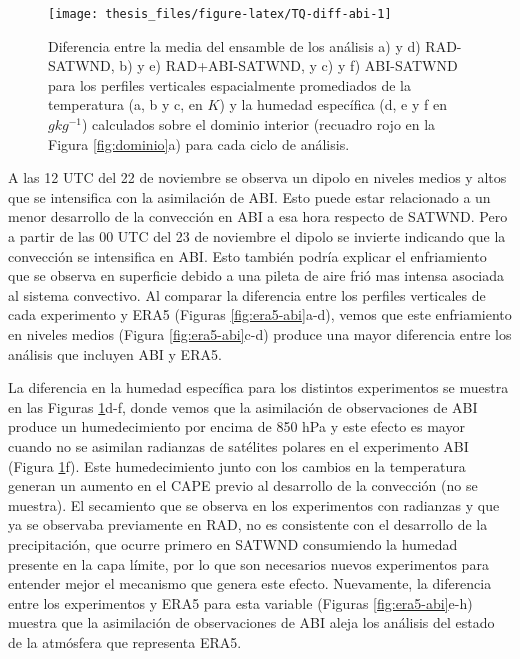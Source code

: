\documentclass[12pt,oneside,a4paper]{reedthesis}
\begin{document}
\begin{figure}

\texttt{[image: thesis\_files/figure-latex/TQ-diff-abi-1]} \hfill{}

\caption{Diferencia entre la media del ensamble de los análisis a) y d) RAD-SATWND, b) y e) RAD+ABI-SATWND, y c) y f) ABI-SATWND para los perfiles verticales espacialmente promediados de la temperatura (a, b y c, en \(K\)) y la humedad específica (d, e y f en \(gkg^{-1}\)) calculados sobre el dominio interior (recuadro rojo en la Figura \ref{fig:dominio}a) para cada ciclo de análisis.}\label{fig:TQ-diff-abi}
\end{figure}
A las 12 UTC del 22 de noviembre se observa un dipolo en niveles medios y altos que se intensifica con la asimilación de ABI. Esto puede estar relacionado a un menor desarrollo de la convección en ABI a esa hora respecto de SATWND. Pero a partir de las 00 UTC del 23 de noviembre el dipolo se invierte indicando que la convección se intensifica en ABI. Esto también podría explicar el enfriamiento que se observa en superficie debido a una pileta de aire frió mas intensa asociada al sistema convectivo.
Al comparar la diferencia entre los perfiles verticales de cada experimento y ERA5 (Figuras \ref{fig:era5-abi}a-d), vemos que este enfriamiento en niveles medios (Figura \ref{fig:era5-abi}c-d) produce una mayor diferencia entre los análisis que incluyen ABI y ERA5.

La diferencia en la humedad específica para los distintos experimentos se muestra en las Figuras \ref{fig:TQ-diff-abi}d-f, donde vemos que la asimilación de observaciones de ABI produce un humedecimiento por encima de 850 hPa y este efecto es mayor cuando no se asimilan radianzas de satélites polares en el experimento ABI (Figura \ref{fig:TQ-diff-abi}f). Este humedecimiento junto con los cambios en la temperatura generan un aumento en el CAPE previo al desarrollo de la convección (no se muestra). El secamiento que se observa en los experimentos con radianzas y que ya se observaba previamente en RAD, no es consistente con el desarrollo de la precipitación, que ocurre primero en SATWND consumiendo la humedad presente en la capa límite, por lo que son necesarios nuevos experimentos para entender mejor el mecanismo que genera este efecto. Nuevamente, la diferencia entre los experimentos y ERA5 para esta variable (Figuras \ref{fig:era5-abi}e-h) muestra que la asimilación de observaciones de ABI aleja los análisis del estado de la atmósfera que representa ERA5.
\end{document}
